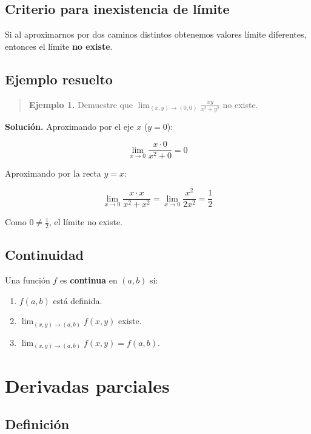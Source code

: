 \documentclass[
]{book}
\providecommand{\tightlist}{%
  \setlength{\itemsep}{0pt}\setlength{\parskip}{0pt}}
\begin{document}
\subsection{Criterio para inexistencia de límite}\label{criterio-para-inexistencia-de-luxedmite}

Si al aproximarnos por dos caminos distintos obtenemos valores límite diferentes, entonces el límite \textbf{no existe}.

\subsection{Ejemplo resuelto}\label{ejemplo-resuelto-8}

\begin{quote}
\textbf{Ejemplo 1.} Demuestre que \(\lim_{(x,y) \to (0,0)} \frac{xy}{x^2 + y^2}\) no existe.
\end{quote}

\textbf{Solución.} Aproximando por el eje \(x\) (\(y = 0\)):

\[
\lim_{x \to 0} \frac{x \cdot 0}{x^2 + 0} = 0
\]

Aproximando por la recta \(y = x\):

\[
\lim_{x \to 0} \frac{x \cdot x}{x^2 + x^2} = \lim_{x \to 0} \frac{x^2}{2x^2} = \frac{1}{2}
\]

Como \(0 \neq \frac{1}{2}\), el límite no existe.

\subsection{Continuidad}\label{continuidad}

Una función \(f\) es \textbf{continua} en \((a, b)\) si:

\begin{enumerate}
\def\labelenumi{\arabic{enumi}.}
\tightlist
\item
  \(f(a, b)\) está definida.
\item
  \(\lim_{(x,y) \to (a,b)} f(x, y)\) existe.
\item
  \(\lim_{(x,y) \to (a,b)} f(x, y) = f(a, b)\).
\end{enumerate}

\section{Derivadas parciales}\label{derivadas-parciales-1}

\subsection{Definición}\label{definiciuxf3n-3}
\end{document}
